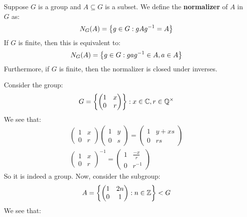 \begin{defn}
    Suppose $ G $ is a group and $ A \subseteq G $ is a subset.
    We define the \textbf{normalizer} of $ A $ in $ G $ as:
    \begin{equation*}
        N_{G}(A) = \left\{{g \in G : gAg^{-1} = A}\right\}
    \end{equation*}
    If $ G $ is finite, then this is equivalent to:
    \begin{equation*}
        N_{G}(A) = \left\{{g \in G : gag^{-1} \in A, a \in A}\right\}
    \end{equation*}
    Furthermore, if $ G $ is finite, then the normalizer is closed under inverses.
\end{defn}

Consider the group:
\begin{equation*}
    G = \left\{{\begin{pmatrix} 1 & x \\ 0 & r \end{pmatrix}}\right\} :
    x \in \mathbb{C}, r \in \mathbb{Q}^{\times}
\end{equation*}
We see that:
\begin{gather*}
    \begin{pmatrix} 1 & x \\ 0 & r \end{pmatrix}
    \begin{pmatrix} 1 & y \\ 0 & s \end{pmatrix}
    = \begin{pmatrix} 1 & y + xs \\ 0 & rs \end{pmatrix} \\
    \begin{pmatrix} 1 & x \\ 0 & r \end{pmatrix}^{-1}
= \begin{pmatrix} 1 & \frac{-x}{r} \\ 0 & r^{-1} \end{pmatrix}
\end{gather*}
So it is indeed a group.
Now, consider the subgroup:
\begin{equation*}
    A = \left\{{\begin{pmatrix} 1 & 2n \\ 0 & 1 \end{pmatrix} :
    n \in \mathbb{Z}}\right\} < G
\end{equation*}
We see that:
